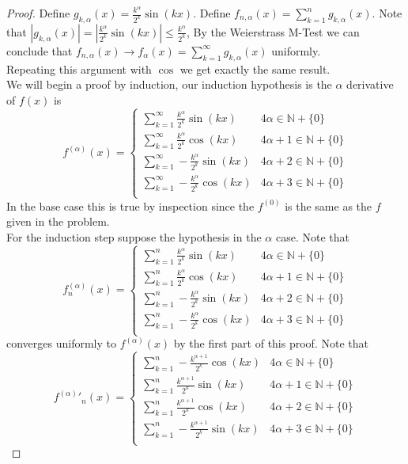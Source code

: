 \documentclass[12pt]{article}
\theoremstyle{homework}
\begin{document}
\begin{proof}
Define $g_{k,\alpha}(x)=\frac{k^\alpha}{2^k}\sin(kx)$.  Define $f_{n,\alpha}(x)=\sum_{k=1}^n g_{k,\alpha}(x)$.  Note that $|g_{k,\alpha}(x)|=|\frac{k^\alpha}{2^k}\sin(kx)|\leq \frac{k^\alpha}{2^k}$, By the Weierstrass M-Test we can conclude that $f_{n,\alpha}(x)\rightarrow f_\alpha(x)=\sum_{k=1}^\infty g_{k,\alpha}(x)$ uniformly.\\
Repeating this argument with $\cos$ we get exactly the same result.\\
We will begin a proof by induction, our induction hypothesis is the $\alpha$ derivative of $f(x)$ is $$f^{(\alpha)}(x)=\begin{cases}
\sum_{k=1}^\infty \frac{k^\alpha}{2^k}\sin(kx) & 4\alpha\in\mathbb{N}+\{0\}\\
\sum_{k=1}^\infty \frac{k^\alpha}{2^k}\cos(kx) & 4\alpha+1 \in\mathbb{N}+\{0\}\\
\sum_{k=1}^\infty -\frac{k^\alpha}{2^k}\sin(kx) & 4\alpha+2 \in\mathbb{N}+\{0\}\\
\sum_{k=1}^\infty -\frac{k^\alpha}{2^k}\cos(kx) & 4\alpha+3 \in\mathbb{N}+\{0\}\\
\end{cases}$$
In the base case this is true by inspection since the $f^{(0)}$ is the same as the $f$ given in the problem.\\
For the induction step suppose the hypothesis in the $\alpha$ case.  Note that $$f^{(\alpha)}_n(x)=\begin{cases}
\sum_{k=1}^n \frac{k^\alpha}{2^k}\sin(kx) & 4\alpha\in\mathbb{N}+\{0\}\\
\sum_{k=1}^n \frac{k^\alpha}{2^k}\cos(kx) & 4\alpha+1 \in\mathbb{N}+\{0\}\\
\sum_{k=1}^n -\frac{k^\alpha}{2^k}\sin(kx) & 4\alpha+2 \in\mathbb{N}+\{0\}\\
\sum_{k=1}^n -\frac{k^\alpha}{2^k}\cos(kx) & 4\alpha+3 \in\mathbb{N}+\{0\}\\
\end{cases}$$
converges uniformly to $f^{(\alpha)}(x)$ by the first part of this proof.  Note that $${f^{(\alpha)}}'_n(x)=\begin{cases}
\sum_{k=1}^n -\frac{k^{\alpha+1}}{2^k}\cos(kx) & 4\alpha\in\mathbb{N}+\{0\}\\
\sum_{k=1}^n \frac{k^{\alpha+1}}{2^k}\sin(kx) & 4\alpha+1 \in\mathbb{N}+\{0\}\\
\sum_{k=1}^n \frac{k^{\alpha+1}}{2^k}\cos(kx) & 4\alpha+2 \in\mathbb{N}+\{0\}\\
\sum_{k=1}^n -\frac{k^{\alpha+1}}{2^k}\sin(kx) & 4\alpha+3 \in\mathbb{N}+\{0\}\\

\end{cases}$$
\end{proof}
\end{document}
